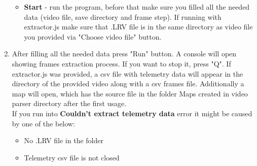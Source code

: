 \documentclass[a4paper,12pt]{book}
\begin{document}
\begin{enumerate}
\begin{itemize}
		\item \textbf{Start} - run the program, before that make sure you filled all the needed data (video file, save directory and frame step). If running with extractor.js make sure that .LRV file is in the same directory as video file you provided via "Choose video file" button.
	\end{itemize}
	\item \begin{minipage}[t]{\linewidth}
		\raggedright
		\medskip	
	\end{minipage}
	After filling all the needed data press "Run" button. A console will open showing frames extraction process. If you want to stop it, press "Q". If extractor.js was provided, a csv file with telemetry data will appear in the directory of the provided video along with a csv frames file. Additionally a map will open, which has the source file in the folder Maps created in video parser directory after the first usage.\\
	If you run into \textbf{Couldn't extract telemetry data} error it might be caused by one of the below:
	\begin{itemize}
		\item No .LRV file in the folder
		\item Telemetry csv file is not closed
	\end{itemize}
\end{enumerate}
\end{document}
